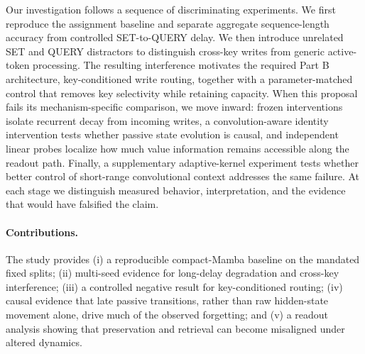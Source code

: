 \documentclass[10pt,a4paper]{article}
\begin{document}
Our investigation follows a sequence of discriminating experiments. We first reproduce the assignment baseline and separate aggregate sequence-length accuracy from controlled SET-to-QUERY delay. We then introduce unrelated SET and QUERY distractors to distinguish cross-key writes from generic active-token processing. The resulting interference motivates the required Part B architecture, key-conditioned write routing, together with a parameter-matched control that removes key selectivity while retaining capacity. When this proposal fails its mechanism-specific comparison, we move inward: frozen interventions isolate recurrent decay from incoming writes, a convolution-aware identity intervention tests whether passive state evolution is causal, and independent linear probes localize how much value information remains accessible along the readout path. Finally, a supplementary adaptive-kernel experiment tests whether better control of short-range convolutional context addresses the same failure. At each stage we distinguish measured behavior, interpretation, and the evidence that would have falsified the claim.

\paragraph{Contributions.} The study provides (i) a reproducible compact-Mamba baseline on the mandated fixed splits; (ii) multi-seed evidence for long-delay degradation and cross-key interference; (iii) a controlled negative result for key-conditioned routing; (iv) causal evidence that late passive transitions, rather than raw hidden-state movement alone, drive much of the observed forgetting; and (v) a readout analysis showing that preservation and retrieval can become misaligned under altered dynamics.
\end{document}

